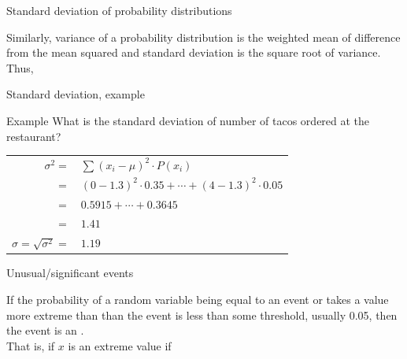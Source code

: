 \documentclass[xcolor=table, aspectratio=169, bigger, handout]{beamer}
\begin{document}
\begin{frame}{Standard deviation of probability distributions}
\begin{block}{}
Similarly, variance of a probability distribution is the weighted mean of difference from the mean squared and standard deviation is the square root of variance.\\
\medskip
Thus, \\ \smallskip
{}
\end{block}
\end{frame}

\begin{frame}{Standard deviation, example}
\begin{exampleblock}{Example}
What is the standard deviation of number of tacos ordered at the restaurant?\\
\medskip
\pause
{\centering
\begin{tabular}{r l}
$\sigma^2 =$ & $\sum (x_i - \mu )^2 \cdot P(x_i)$\\
$=$ & $(0-1.3)^2 \cdot 0.35 + \cdots + (4-1.3)^2 \cdot 0.05$\\
$=$ & $0.5915 + \cdots + 0.3645$\\
$=$ & $1.41$\\
\pause$\sigma = \sqrt{\sigma^2} = $ & $1.19$
\end{tabular}\par
\renewcommand{\arraystretch}{1.5}}
\end{exampleblock}
\end{frame}


\begin{frame}{Unusual/significant events}
\begin{block}{}
If the probability of a random variable being equal to an event or takes a value more extreme than than the event is less than some threshold, usually 0.05, then the event is an .\\
\medskip
\pause
That is, if $x$ is an extreme value if\\ \medskip
{}
\medskip
\end{block}
\end{frame}
\end{document}
